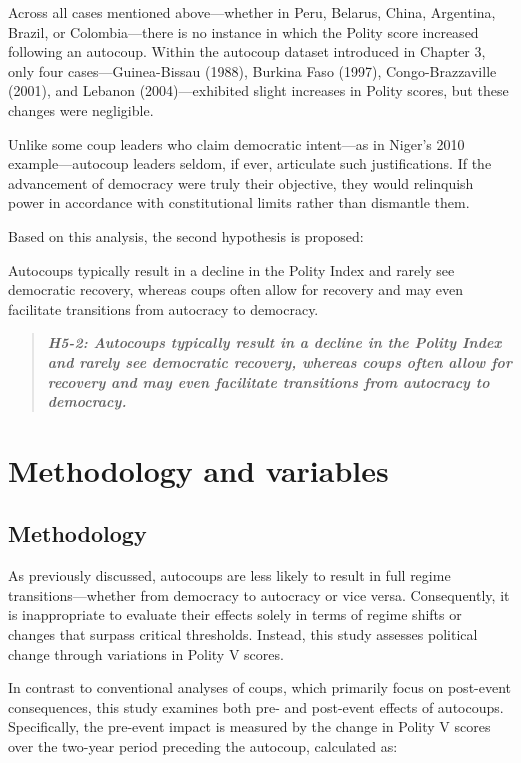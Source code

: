 \documentclass[
  12pt,
]{report}
\begin{document}
Across all cases mentioned above---whether in Peru, Belarus, China,
Argentina, Brazil, or Colombia---there is no instance in which the
Polity score increased following an autocoup. Within the autocoup
dataset introduced in Chapter 3, only four cases---Guinea-Bissau (1988),
Burkina Faso (1997), Congo-Brazzaville (2001), and Lebanon
(2004)---exhibited slight increases in Polity scores, but these changes
were negligible.

Unlike some coup leaders who claim democratic intent---as in Niger's
2010 example---autocoup leaders seldom, if ever, articulate such
justifications. If the advancement of democracy were truly their
objective, they would relinquish power in accordance with constitutional
limits rather than dismantle them.

Based on this analysis, the second hypothesis is proposed:

Autocoups typically result in a decline in the Polity Index and rarely
see democratic recovery, whereas coups often allow for recovery and may
even facilitate transitions from autocracy to democracy.

\begin{quote}
\textbf{\emph{H5-2: Autocoups typically result in a decline in the
Polity Index and rarely see democratic recovery, whereas coups often
allow for recovery and may even facilitate transitions from autocracy to
democracy.}}
\end{quote}

\section{Methodology and variables}\label{methodology-and-variables}

\subsection{Methodology}\label{methodology-1}

As previously discussed, autocoups are less likely to result in full
regime transitions---whether from democracy to autocracy or vice versa.
Consequently, it is inappropriate to evaluate their effects solely in
terms of regime shifts or changes that surpass critical thresholds.
Instead, this study assesses political change through variations in
Polity V scores.

In contrast to conventional analyses of coups, which primarily focus on
post-event consequences, this study examines both pre- and post-event
effects of autocoups. Specifically, the pre-event impact is measured by
the change in Polity V scores over the two-year period preceding the
autocoup, calculated as:
\end{document}
